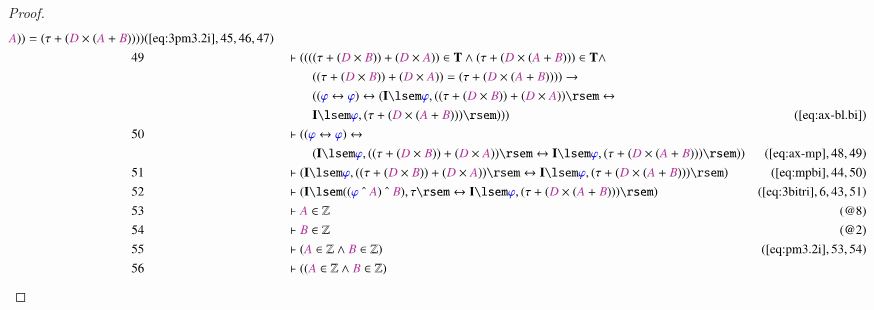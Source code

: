 \begin{proof}
\begin{align}
      \mc{A} ) ) = ( \tau + ( \mc{D} \times ( \mc{A} +
      \mc{B} ) ) )
      )&(\mbox{\ref{eq:3pm3.2i}},45,46,47)\notag
  \\ 49 &&  & \vdash ( ( ( ( \tau + ( \mc{D} \times \mc{B} ) ) + ( \mc{D} \times
      \mc{A} ) ) \in \mathbf{T} \wedge ( \tau + ( \mc{D}
      \times ( \mc{A} + \mc{B} ) ) ) \in \mathbf{T} \wedge  \notag \\ & & & \qquad
      (
      ( \tau + ( \mc{D} \times \mc{B} ) ) + ( \mc{D} \times
      \mc{A} ) ) = ( \tau + ( \mc{D} \times ( \mc{A} +
      \mc{B} ) ) ) ) \rightarrow \notag \\ & & & \qquad
       ( ( \mw{\varphi}
      \leftrightarrow \mw{\varphi} ) \leftrightarrow (
      \mathbf{I} \lsem \mw{\varphi} , ( ( \tau + ( \mc{D}
      \times \mc{B} ) ) + ( \mc{D} \times \mc{A} ) ) \rsem
      \leftrightarrow  \notag \\ & & & \qquad
      \mathbf{I} \lsem \mw{\varphi} , (
      \tau + ( \mc{D} \times ( \mc{A} + \mc{B} ) ) ) \rsem )
      ) )&(\mbox{\ref{eq:ax-bl.bi}})\notag
  \\ 50 &&  & \vdash ( ( \mw{\varphi} \leftrightarrow \mw{\varphi} )
      \leftrightarrow  \notag \\ & & & \qquad
      ( \mathbf{I} \lsem \mw{\varphi} , ( (
      \tau + ( \mc{D} \times \mc{B} ) ) + ( \mc{D} \times
      \mc{A} ) ) \rsem \leftrightarrow \mathbf{I} \lsem
      \mw{\varphi} , ( \tau + ( \mc{D} \times ( \mc{A} +
      \mc{B} ) ) ) \rsem )
      )&(\mbox{\ref{eq:ax-mp}},48,49)\notag
  \\ 51 &&  & \vdash ( \mathbf{I} \lsem \mw{\varphi} , ( ( \tau + ( \mc{D}
      \times \mc{B} ) ) + ( \mc{D} \times \mc{A} ) ) \rsem
      \leftrightarrow \mathbf{I} \lsem \mw{\varphi} , (
      \tau + ( \mc{D} \times ( \mc{A} + \mc{B} ) ) ) \rsem
      )&(\mbox{\ref{eq:mpbi}},44,50)\notag
  \\ 52 &&  & \vdash ( \mathbf{I} \lsem ( ( \mw{\varphi} ~\string^~ \mc{A} )
      ~\string^~ \mc{B} ) , \tau \rsem \leftrightarrow
      \mathbf{I} \lsem \mw{\varphi} , ( \tau + ( \mc{D}
      \times ( \mc{A} + \mc{B} ) ) ) \rsem
      )&(\mbox{\ref{eq:3bitri}},6,43,51)\notag
  \\ 53 &&  & \vdash \mc{A} \in \mathbb{Z}&(@8)\notag
  \\ 54 &&  & \vdash \mc{B} \in \mathbb{Z}&(@2)\notag
  \\ 55 &&  & \vdash ( \mc{A} \in \mathbb{Z} \wedge \mc{B} \in \mathbb{Z}
      )&(\mbox{\ref{eq:pm3.2i}},53,54)\notag
  \\ 56 &&  & \vdash ( ( \mc{A} \in \mathbb{Z} \wedge \mc{B} \in \mathbb{Z} )

\end{align}
\end{proof}
